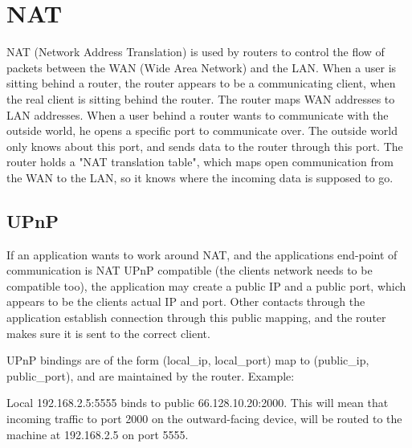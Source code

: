\section{NAT}
NAT (Network Address Translation) is used by routers to control the flow of
packets between the WAN (Wide Area Network) and the LAN. When a user is sitting
behind a router, the router appears to be a communicating client, when the real
client is sitting behind the router. The router maps WAN addresses to LAN
addresses. When a user behind a router wants to communicate with the outside
world, he opens a specific port to communicate over. The outside world only
knows about this port, and sends data to the router through this port. The
router holds a "NAT translation table", which maps open communication from the
WAN to the LAN, so it knows where the incoming data is supposed to go.

\subsection{UPnP}
If an application wants to work around NAT, and the applications end-point of
communication is NAT UPnP compatible (the clients network needs to be
compatible too), the application may create a public IP and a public port, which
appears to be the clients actual IP and port. Other contacts through the
application establish connection through this public mapping, and the router
makes sure it is sent to the correct client.

UPnP bindings are of the form (local\_ip, local\_port) map to (public\_ip, 
public\_port), and are maintained by the router. Example:

Local 192.168.2.5:5555 binds to public 66.128.10.20:2000. This will mean that
incoming traffic to port 2000 on the outward-facing device, will be routed to
the machine at 192.168.2.5 on port 5555.
